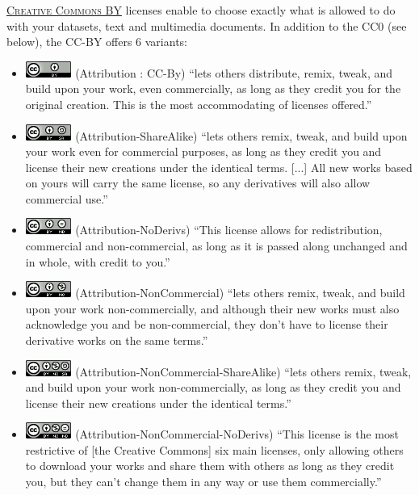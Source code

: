 \noindent {} \textsc{\href{https://creativecommons.org/}{Creative Commons BY}} licenses enable to choose exactly what is allowed to do with your datasets, text and multimedia documents. In addition to the CC0 (see below), the CC-BY offers 6 variants\cite{creativecommons.org_creative_2015}:
\begin{itemize}
\item\includegraphics[width=15mm]{./images/CC-By_88x31.png} (Attribution : CC-By) ``lets others distribute, remix, tweak, and build upon your work, even commercially, as long as they credit you for the original creation. This is the most accommodating of licenses offered.''
\item\includegraphics[width=15mm]{./images/CC-By-SA_88x31.png} (Attribution-ShareAlike) ``lets others remix, tweak, and build upon your work even for commercial purposes, as long as they credit you and license their new creations under the identical terms. [...] All new works based on yours will carry the same license, so any derivatives will also allow commercial use.''
\item\includegraphics[width=15mm]{./images/CC-By-ND_88x31.png} (Attribution-NoDerivs) ``This license allows for redistribution, commercial and non-commercial, as long as it is passed along unchanged and in whole, with credit to you.''
\item\includegraphics[width=15mm]{./images/CC-By-NC_88x31.png} (Attribution-NonCommercial) ``lets others remix, tweak, and build upon your work non-commercially, and although their new works must also acknowledge you and be non-commercial, they don’t have to license their derivative works on the same terms.''
\item\includegraphics[width=15mm]{./images/CC-By-NC-SA_88x31.png} (Attribution-NonCommercial-ShareAlike) ``lets others remix, tweak, and build upon your work non-commercially, as long as they credit you and license their new creations under the identical terms.''
\item\includegraphics[width=15mm]{./images/CC-By-NC-ND_88x31.png} (Attribution-NonCommercial-NoDerivs) ``This license is the most restrictive of [the Creative Commons] six main licenses, only allowing others to download your works and share them with others as long as they credit you, but they can’t change them in any way or use them commercially.''
\end{itemize}

